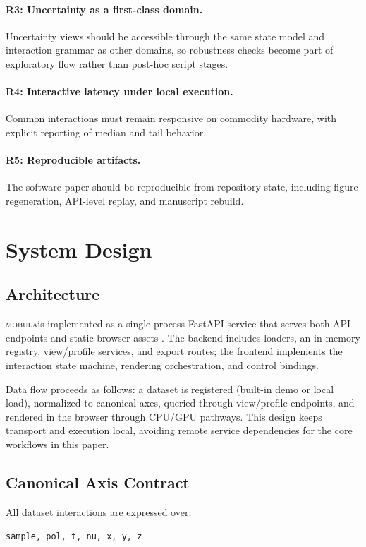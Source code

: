 \documentclass[11pt]{article}
\newcommand{\tool}{\textsc{mobula}}
\begin{document}
\paragraph{R3: Uncertainty as a first-class domain.}
Uncertainty views should be accessible through the same state model and interaction grammar as other domains, so robustness checks become part of exploratory flow rather than post-hoc script stages.

\paragraph{R4: Interactive latency under local execution.}
Common interactions must remain responsive on commodity hardware, with explicit reporting of median and tail behavior.

\paragraph{R5: Reproducible artifacts.}
The software paper should be reproducible from repository state, including figure regeneration, API-level replay, and manuscript rebuild.

\section{System Design}
\subsection{Architecture}
\tool is implemented as a single-process FastAPI service that serves both API endpoints and static browser assets \cite{fastapi,mobula2026}. The backend includes loaders, an in-memory registry, view/profile services, and export routes; the frontend implements the interaction state machine, rendering orchestration, and control bindings.

Data flow proceeds as follows: a dataset is registered (built-in demo or local load), normalized to canonical axes, queried through view/profile endpoints, and rendered in the browser through CPU/GPU pathways. This design keeps transport and execution local, avoiding remote service dependencies for the core workflows in this paper.

\subsection{Canonical Axis Contract}
All dataset interactions are expressed over:
\begin{center}
\texttt{sample, pol, t, nu, x, y, z}
\end{center}
\end{document}
